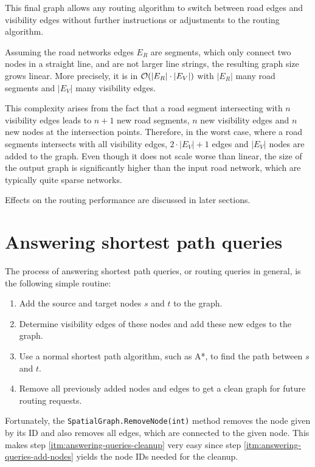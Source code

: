 		This final graph allows any routing algorithm to switch between road edges and visibility edges without further instructions or adjustments to the routing algorithm.

		Assuming the road networks edges $E_R$ are segments, which only connect two nodes in a straight line, and are not larger line strings, the resulting graph size grows linear.
		More precisely, it is in $\mathcal{O}(|E_R| \cdot |E_V|)$ with $|E_R|$ many road segments and $|E_V|$ many visibility edges.
		
		This complexity arises from the fact that a road segment intersecting with $n$ visibility edges leads to $n+1$ new road segments, $n$ new visibility edges and $n$ new nodes at the intersection points.
		Therefore, in the worst case, where a road segments intersects with all visibility edges, $2 \cdot |E_V| + 1$ edges and $|E_V|$ nodes are added to the graph.
		Even though it does not scale worse than linear, the size of the output graph is significantly higher than the input road network, which are typically quite sparse networks.

		Effects on the routing performance are discussed in later sections. 
	
\section{Answering shortest path queries}
\label{sec:answering-queries}

	The process of answering shortest path queries, or routing queries in general, is the following simple routine:
	\begin{enumerate}
		\item \label{itm:answering-queries-add-nodes} Add the source and target nodes $s$ and $t$ to the graph.
		\item \label{itm:answering-queries-vis-edges} Determine visibility edges of these nodes and add these new edges to the graph.
		\item \label{itm:answering-queries-routing} Use a normal shortest path algorithm, such as A*, to find the path between $s$ and $t$.
		\item \label{itm:answering-queries-cleanup} Remove all previously added nodes and edges to get a clean graph for future routing requests.
	\end{enumerate}
	Fortunately, the \texttt{SpatialGraph.RemoveNode(int)} method removes the node given by its ID and also removes all edges, which are connected to the given node.
	This makes step \ref{itm:answering-queries-cleanup} very easy since step \ref{itm:answering-queries-add-nodes} yields the node IDs needed for the cleanup.
	
